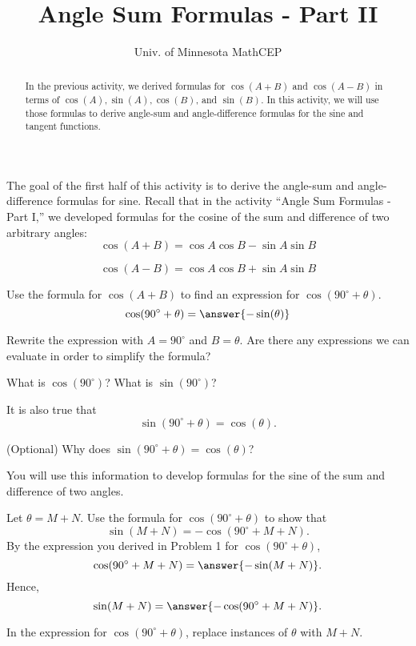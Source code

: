 \documentclass[number]{ximera}
\title{Angle Sum Formulas - Part II}
\author{Univ. of Minnesota MathCEP}
\begin{document}
\begin{abstract}
In the previous activity, we derived formulas for $\cos(A+B)$ and $\cos(A-B)$ in terms of $\cos(A),\sin(A),\cos(B)$, and $\sin(B)$.
In this activity, we will use those formulas to derive angle-sum and angle-difference formulas for the sine and tangent functions.
\end{abstract}

\maketitle

The goal of the first half of this activity is to derive the angle-sum and angle-difference formulas for sine.
Recall that in the activity ``Angle Sum Formulas - Part I,'' we developed formulas for the cosine of the sum and difference of two arbitrary angles:
\[ \cos(A+B) = \cos A \cos B - \sin A \sin B \]

\[ \cos(A-B) = \cos A \cos B + \sin A \sin B \]

\begin{problem}
Use the formula for $\cos(A+B)$ to find an expression for $\cos(90^\circ + \theta)$.
\[\cos(90^\circ + \theta) = \answer{-\sin(\theta)}\]
\begin{hint}
Rewrite the expression with $A=90^\circ$ and $B=\theta$. Are there any expressions we can evaluate in order to simplify the formula?
\end{hint}
\begin{hint}
What is $\cos(90^\circ)$? What is $\sin(90^\circ)$?
\end{hint}

\end{problem}

It is also true that \[\sin(90^\circ+\theta) = \cos(\theta).\]
\begin{question}
(Optional) Why does $\sin(90^\circ+\theta)=\cos(\theta)$?
\begin{freeResponse}
\end{freeResponse}
\end{question}

You will use this information to develop formulas for the sine of the sum and difference of two angles.

\begin{problem}
Let $\theta = M+N$. Use the formula for $\cos(90^\circ+\theta)$ to show that
\[\sin(M+N)=-\cos(90^\circ+M+N).\]
By the expression you derived in Problem 1 for $\cos(90^\circ+\theta)$,
\[\cos(90^\circ+M+N) = \answer{-\sin(M+N)}.\]
Hence,
\[\sin(M+N)=\answer{-\cos(90^\circ+M+N)}.\]
\begin{hint}
In the expression for $\cos(90^\circ+\theta)$, replace instances of $\theta$ with $M+N$.
\end{hint}
\end{problem}
\end{document}
